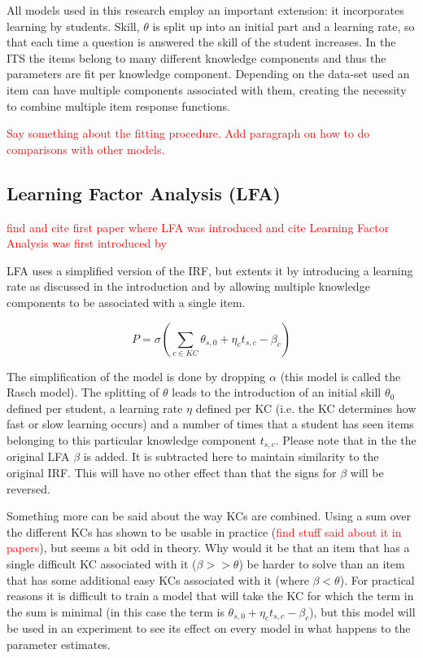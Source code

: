 \documentclass{article}
\newcommand\todo[1]{\textcolor{red}{#1}}
\begin{document}
All models used in this research employ an important extension: it incorporates learning by students. Skill, $\theta$ is split up into an initial part and a learning rate, so that each time a question is answered the skill of the student increases. In the ITS the items belong to many different knowledge components and thus the parameters are fit per knowledge component. Depending on the data-set used an item can have multiple components associated with them, creating the necessity to combine multiple item response functions.

\todo{Say something about the fitting procedure.
Add paragraph on how to do comparisons with other models.}

\subsection{Learning Factor Analysis (LFA)}
\label{sec:LFA}
\todo{find and cite first paper where LFA was introduced and cite Learning Factor Analysis was first introduced by}


LFA uses a simplified version of the IRF, but extents it by introducing a learning rate as discussed in the introduction and by allowing multiple knowledge components to be associated with a single item.

\begin{equation}
P = \sigma(\sum_{c \in KC} \theta_{s,0} + \eta_{c} t_{s,c} - \beta_{c})
\end{equation}

The simplification of the model is done by dropping $\alpha$ (this model is called the Rasch model). The splitting of $\theta$ leads to the introduction of an initial skill $\theta_{0}$ defined per student, a learning rate $\eta$ defined per KC (i.e. the KC determines how fast or slow learning occurs) and a number of times that a student has seen items belonging to this particular knowledge component $t_{s,c}$. Please note that in the the original LFA $\beta$ is added. It is subtracted here to maintain similarity to the original IRF. This will have no other effect than that the signs for $\beta$ will be reversed.

Something more can be said about the way KCs are combined. Using a sum over the different KCs has shown to be usable in practice (\todo{find stuff said about it in papers}), but seems a bit odd in theory. Why would it be that an item that has a single difficult KC associated with it ($\beta >> \theta$) be harder to solve than an item that has some additional easy KCs associated with it (where $\beta < \theta$). For practical reasons it is difficult to train a model that will take the KC for which the term in the sum is minimal (in this case the term is $\theta_{s,0} + \eta_{c} t_{s,c} - \beta_{c}$), but this model will be used in an experiment to see its effect on every model in what happens to the parameter estimates.
\end{document}
